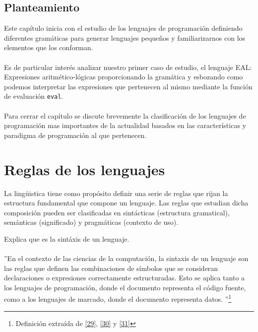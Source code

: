 \subsection*{Planteamiento}
    Este capítulo inicia con el estudio de los lenguajes de programación definiendo diferentes gramáticas para generar lenguajes pequeños y familiarizarnos con los elementos que los conforman.\\\\
    Es de particular interés analizar nuestro primer caso de estudio, el lenguaje \textsf{EAL}: Expresiones aritmético-lógicas proporcionando la gramática y esbozando como podemos interpretar las expresiones que pertenecen al mismo mediante la función de evaluación \texttt{eval}.\\\\
    Para cerrar el capítulo se discute brevemente la clasificación de los lenguajes de programación mas importantes de la actualidad basados en las características y paradigma de programación al que pertenecen. 

\section{Reglas de los lenguajes}

    La lingüistica tiene como propósito definir una serie de reglas que rijan la estructura fundamental que compone un lenguaje.
Las reglas que estudian dicha composición pueden ser clasificadas en sintácticas (estructura gramatical), semánticas (significado) y pragmáticas (contexto de uso).\\


    \begin{exercise}
        Explica que es la sintáxis  de un lenguaje.     \\\\
        ''En el contexto de las ciencias de la computación, la sintaxis de un lenguaje son las reglas que definen las combinaciones de símbolos que se consideran declaraciones o expresiones correctamente estructuradas. Esto se aplica tanto a los lenguajes de programación, donde el documento representa el código fuente, como a los lenguajes de marcado, donde el documento representa datos. ''\footnote{Definición extraída de  \hyperlink{29}{[29]}, \hyperlink{30}{[30]} y \hyperlink{31}{[31]}}
        
    \end{exercise}


